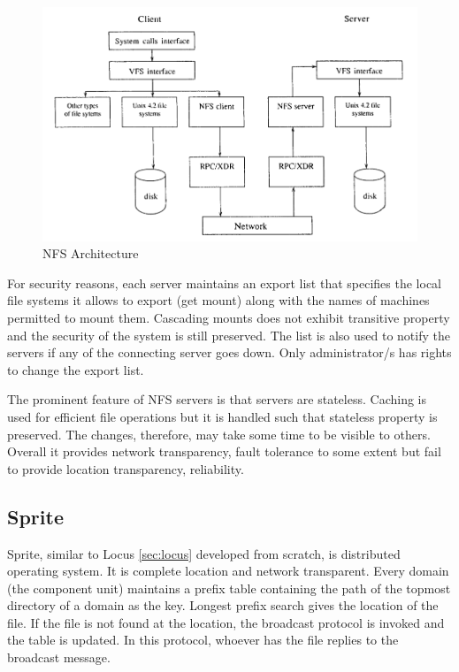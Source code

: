 \documentclass[a4paper,12pt]{article}
\begin{document}
\begin{figure}[h]
  \begin{center}
    \includegraphics[scale = 0.4]{images/nfs}
  \end{center}
  \caption{NFS Architecture}
  \label{nfs_design}
\end{figure}

For security reasons, each server maintains an export list that specifies the local file systems it allows to export (get mount) along with the names of machines permitted to mount them. Cascading mounts does not exhibit transitive property and the security of the system is still preserved. The list is also used to notify the servers if any of the connecting server goes down. Only administrator/s has rights to change the export list.

The prominent feature of NFS servers is that servers are stateless. Caching is used for efficient file operations but it is handled such that stateless property is preserved. The changes, therefore, may take some time to be visible to others. Overall it provides network transparency, fault tolerance to some extent but fail to provide location transparency, reliability.

\subsection{Sprite \cite[p.~357]{old_dfs}}
\label{sec:sprite}
Sprite, similar to Locus \ref{sec:locus} developed from scratch, is distributed operating system. It is complete location and network transparent. Every domain (the component unit) maintains a prefix table containing the path of the topmost directory of a domain as the key. Longest prefix search gives the location of the file. If the file is not found at the location, the broadcast protocol is invoked and the table is updated. In this protocol, whoever has the file replies to the broadcast message.
\end{document}
